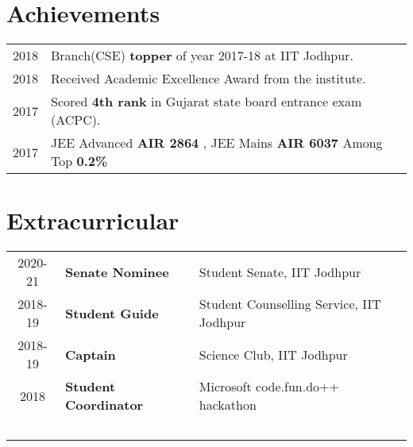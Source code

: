 \documentclass[a4paper]{deedy-resume-openfont}
\begin{document}
\begin{minipage}[t]{0.63\textwidth}

\section{Achievements}
\begin{tabular}{l p{}}
2018 & Branch(CSE) \textbf{topper} of year 2017-18 at IIT Jodhpur. \\
2018 & Received Academic Excellence Award from the institute. \\
2017 & Scored \textbf{4th rank} in Gujarat state board entrance exam (ACPC). \\
2017 & JEE Advanced \textbf{AIR 2864} , JEE Mains \textbf{AIR 6037} Among Top \textbf{0.2\%} \\
\end{tabular}
\sectionsep



\section{Extracurricular}
\begin{tabular}{ c l l }  
2020-21 & \textbf{Senate Nominee} & Student Senate, IIT Jodhpur \\  
2018-19 & \textbf{Student Guide} & Student Counselling Service, IIT Jodhpur \\
2018-19 & \textbf{Captain} & Science Club, IIT Jodhpur \\
  2018  & \textbf{Student Coordinator} & Microsoft code.fun.do++ hackathon\\\
 \end{tabular}
 
\end{minipage} 
\end{document}
